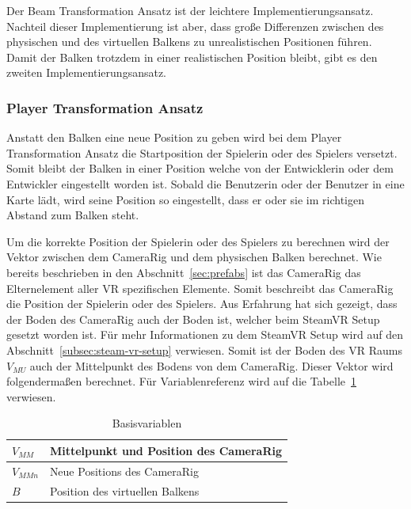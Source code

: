 Der Beam Transformation Ansatz ist der leichtere Implementierungsansatz.
Nachteil dieser Implementierung ist aber, dass große Differenzen zwischen des physischen und des virtuellen Balkens zu unrealistischen Positionen führen.
Damit der Balken trotzdem in einer realistischen Position bleibt, gibt es den zweiten Implementierungsansatz.

\subsubsection{Player Transformation Ansatz}

Anstatt den Balken eine neue Position zu geben wird bei dem Player Transformation Ansatz die Startposition der Spielerin oder des Spielers versetzt.
Somit bleibt der Balken in einer Position welche von der Entwicklerin oder dem Entwickler eingestellt worden ist.
Sobald die Benutzerin oder der Benutzer in eine Karte lädt, wird seine Position so eingestellt, dass er oder sie im richtigen Abstand zum Balken steht.

Um die korrekte Position der Spielerin oder des Spielers zu berechnen wird der Vektor zwischen dem CameraRig und dem physischen Balken berechnet.
Wie bereits beschrieben in den Abschnitt~\ref{sec:prefabs} ist das CameraRig das Elternelement aller VR spezifischen Elemente.
Somit beschreibt das CameraRig die Position der Spielerin oder des Spielers.
Aus Erfahrung hat sich gezeigt, dass der Boden des CameraRig auch der Boden ist, welcher beim SteamVR Setup gesetzt worden ist.
Für mehr Informationen zu dem SteamVR Setup wird auf den Abschnitt~\ref{subsec:steam-vr-setup} verwiesen.
Somit ist der Boden des VR Raums $V_{MU}$ auch der Mittelpunkt des Bodens von dem CameraRig.
Dieser Vektor wird folgendermaßen berechnet.
Für Variablenreferenz wird auf die Tabelle~\ref{tab:variables_advanced} verwiesen.

\begin{table}[]
    \centering
    \begin{tabular}{|l|l|}
        \hline
        $V_{MM}$  & Mittelpunkt und Position des CameraRig                  \\ \hline
        $V_{MMn}$ & Neue Positions des CameraRig                            \\ \hline
        $B$       & Position des virtuellen Balkens                         \\ \hline
    \end{tabular}
    \caption{Basisvariablen}
    \label{tab:variables_advanced}
\end{table}

